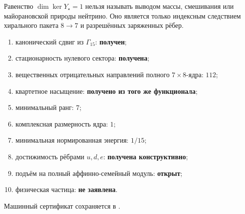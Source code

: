 \begin{nogocriterion}
Равенство $\dim\ker Y_\star=1$ нельзя называть выводом массы, смешивания или
майорановской природы нейтрино. Оно является только индексным следствием
хирального пакета $8\to7$ и разрешённых заряженных рёбер.
\end{nogocriterion}

\begin{protocol}
\begin{enumerate}
 \item канонический сдвиг из $\Gamma_{15}$: \textbf{получен};
 \item стационарность нулевого сектора: \textbf{получена};
 \item вещественных отрицательных направлений полного $7\times8$-ядра:
 \textbf{$112$};
 \item квартетное насыщение: \textbf{получено из того же функционала};
 \item минимальный ранг: \textbf{$7$};
 \item комплексная размерность ядра: \textbf{$1$};
 \item минимальная нормированная энергия: \textbf{$1/15$};
 \item достижимость рёбрами $u,d,e$: \textbf{получена конструктивно};
 \item подъём на полный аффинно-семейный модуль: \textbf{открыт};
 \item физическая частица: \textbf{не заявлена}.
\end{enumerate}
\end{protocol}

Машинный сертификат сохраняется в
.